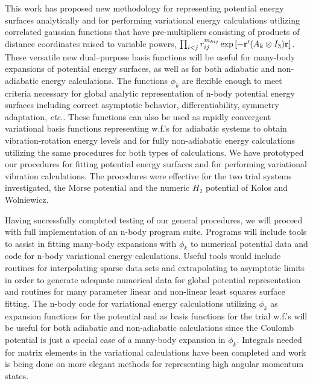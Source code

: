 This work has proposed new methodology for representing potential energy
surfaces analytically and for performing variational energy calculations
utilizing correlated gaussian functions that have pre-multipliers consisting
of products of distance coordinates raised to variable powers, 
$\prod_{i<j}r_{ij}^{m_{kij}}\exp \left[ -{\bf r}^{\prime%
}(A_k\otimes I_3){\bf r}\right]$.
These versatile new dual--purpose basis functions will be
useful for many-body expansions of potential energy surfaces, 
as well as for
both adiabatic and non-adiabatic energy calculations. The functions $\phi _k$
are flexible enough to meet criteria necessary for global analytic
representation of n-body potential energy surfaces including correct
asymptotic behavior, differentiability, symmetry adaptation, {\it etc.}. 
These
functions can also be used as rapidly convergent variational basis functions
representing w.f.'s for adiabatic systems to obtain
vibration-rotation energy levels and for fully non-adiabatic energy
calculations utilizing the same procedures for both types of calculations.
We have prototyped our procedures for fitting potential energy surfaces and
for performing variational vibration calculations. The procedures were
effective for the two trial systems investigated, the Morse potential and
the numeric $H_2$ potential of Kolos and Wolniewicz\cite{Kolos65}.

Having successfully completed testing of our general procedures, we will
proceed with full implementation of an n-body program suite. Programs will
include tools to assist in fitting many-body expansions with $\phi _k$ to
numerical potential data and code for n-body variational energy
calculations. Useful tools would include routines for interpolating sparse
data sets and extrapolating to asymptotic limits in order to generate
adequate numerical data for global potential representation and routines for
many parameter linear and non-linear least squares surface fitting. The
n-body code for variational energy calculations utilizing $\phi _k$ as
expansion functions for the potential and as basis functions for the trial
w.f.'s will be useful for both adiabatic and non-adiabatic
calculations since the Coulomb potential is just a special case of a
many-body expansion in $\phi _k$. Integrals needed for matrix elements in
the variational calculations have been completed and work is being done on
more elegant methods for representing high angular momentum states.


